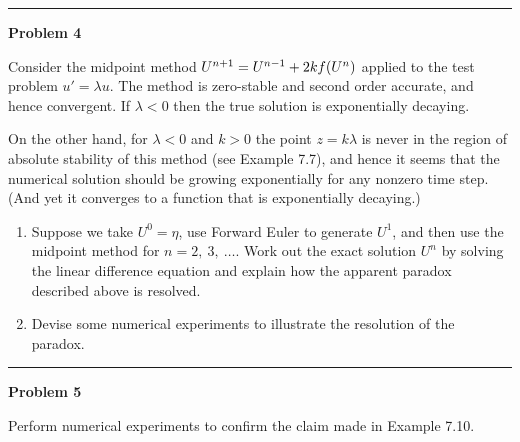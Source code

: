\documentclass[10pt]{article}
\begin{document}


\vskip 1cm
\hrule
{\bf Problem 4}

Consider the midpoint method $U^{n+1} = U^{n-1} + 2kf(U^n)$ applied to the test
problem $u' = \lambda u$.  The method is zero-stable and second order
accurate, and hence convergent.  If $\lambda<0$ then the true solution
is exponentially decaying.

On the other hand, for $\lambda<0$ and $k>0$ the point $z=k\lambda$ is never
in the region of absolute stability of this method (see Example 7.7),
and hence it seems that the numerical solution should be growing
exponentially for any nonzero time step.  (And yet it converges to
a function that is exponentially decaying.)

\begin{enumerate} 
\item
Suppose we take $U^0=\eta$, use Forward Euler to generate $U^1$, and then
use the midpoint method for $n=2,~3,~\ldots$.  Work out the exact solution
$U^n$ by solving the linear difference equation and explain how the apparent
paradox described above is resolved.

\item Devise some numerical experiments to illustrate the resolution of the
paradox.
\end{enumerate} 






\vskip 1cm
\hrule
{\bf Problem 5}


Perform numerical experiments to confirm the claim made in Example 7.10.



\end{document}
